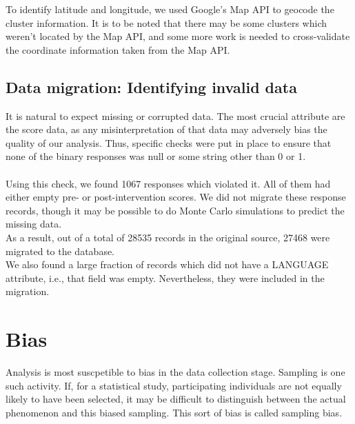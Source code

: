 \documentclass[10pt]{article}
\begin{document}
To identify latitude and longitude, we used Google's Map API to geocode the cluster information. It is to be noted that there may be some clusters which weren't located by the Map API, and some more work is needed to cross-validate the coordinate information taken from the Map API.

\newpage
\subsection{Data migration: Identifying invalid data}
It is natural to expect missing or corrupted data. The most crucial attribute are the score data, as any misinterpretation of that data may adversely bias the quality of our analysis. Thus, specific checks were put in place to ensure that none of the binary responses was null or some string other than 0 or 1.\\\\
Using this check, we found 1067 responses which violated it. All of them had either empty pre- or post-intervention scores. We did not migrate these response records, though it may be possible to do Monte Carlo simulations to predict the missing data.\\
As a result, out of a total of 28535 records in the original source, 27468 were migrated to the database.\\
We also found a large fraction of records which did not have a LANGUAGE attribute, i.e., that field was empty. Nevertheless, they were included in the migration.

\newpage
\section{Bias}
Analysis is most suscpetible to bias in the data collection stage. Sampling is one such activity. If, for a statistical study, participating individuals are not equally likely to have been selected, it may be difficult to distinguish between the actual phenomenon and this biased sampling.
This sort of bias is called sampling bias.

\newpage
\end{document}
